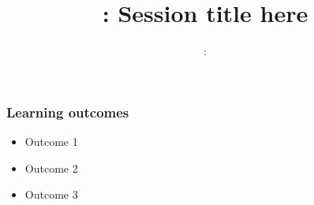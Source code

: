 \usepackage{../../beamerthemeFalmouthGamesAcademy}
\usepackage{multimedia}
\graphicspath{ {../../} }


\usepackage[normalem]{ulem}
\usepackage{wasysym}

\usepackage{pdfpages}

\usetikzlibrary{arrows,automata}




\title{\sessionnumber: Session title here}
\subtitle{\modulecode: \moduletitle}

\frame{\titlepage} 

\begin{frame}
	\frametitle{Learning outcomes}
	\begin{itemize}
		\item Outcome 1
		\item Outcome 2
		\item Outcome 3
	\end{itemize}
\end{frame}






